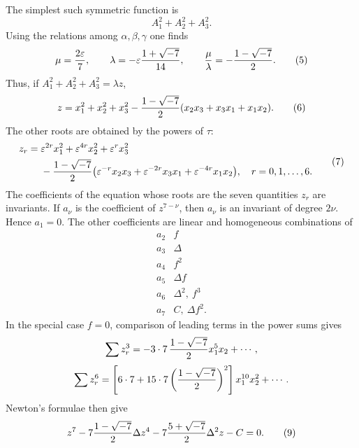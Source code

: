 \documentclass[11pt]{article}
\newcommand{\eps}{\varepsilon}
\begin{document}
The simplest such symmetric function is
\begin{equation}
A_1^2+A_2^2+A_3^2.
\tag{4}
\end{equation}
Using the relations among \(\alpha,\beta,\gamma\) one finds
\begin{equation}
\mu={2\eps\over7},\qquad
\lambda=-\eps {1+\sqrt{-7}\over14},\qquad {\mu\over\lambda}=-{1-\sqrt{-7}\over2}.
\tag{5}
\end{equation}
Thus, if \(A_1^2+A_2^2+A_3^2=\lambda z\),
\begin{equation}
z=x_1^2+x_2^2+x_3^2-{1-\sqrt{-7}\over2}(x_2x_3+x_3x_1+x_1x_2).
\tag{6}
\end{equation}
The other roots are obtained by the powers of \(\tau\):
\begin{equation}
\begin{aligned}
z_r={}&\eps^{2r}x_1^2+\eps^{4r}x_2^2+\eps^rx_3^2\\
&-{1-\sqrt{-7}\over2}\bigl(\eps^{-r}x_2x_3+\eps^{-2r}x_3x_1+\eps^{-4r}x_1x_2\bigr),\quad r=0,1,\ldots,6.
\end{aligned}
\tag{7}
\end{equation}
The coefficients of the equation whose roots are the seven quantities \(z_r\) are invariants. If \(a_\nu\) is the coefficient of \(z^{7-\nu}\), then \(a_\nu\) is an invariant of degree \(2\nu\). Hence \(a_1=0\). The other coefficients are linear and homogeneous combinations of
\begin{equation}
\begin{array}{c|c}
a_2&f\\
a_3&\Delta\\
a_4&f^2\\
a_5&\Delta f\\
a_6&\Delta^2,\ f^3\\
a_7&C,\ \Delta f^2.
\end{array}
\tag{8}
\end{equation}
In the special case \(f=0\), comparison of leading terms in the power sums gives
\begin{equation}
\sum z_r^3=-3\cdot7\,{1-\sqrt{-7}\over2}x_1^5x_2+\cdots,
\end{equation}
\begin{equation}
\sum z_r^6=\left[6\cdot7+15\cdot7\left({1-\sqrt{-7}\over2}\right)^2\right]x_1^{10}x_2^2+\cdots.
\end{equation}
Newton's formulae then give
\begin{equation}
z^7-7{1-\sqrt{-7}\over2}\Delta z^4-7{5+\sqrt{-7}\over2}\Delta^2z-C=0.
\tag{9}
\end{equation}
\end{document}
